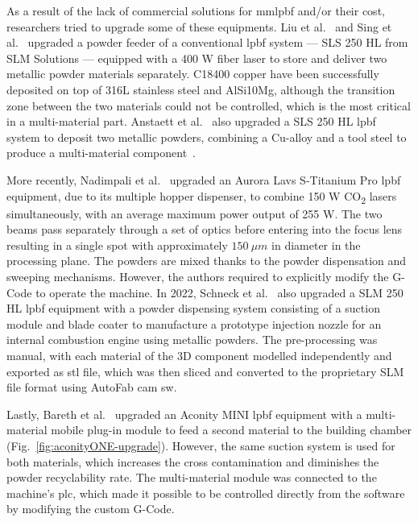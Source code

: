 As a result of the lack of commercial solutions for \gls{mmlpbf} and/or their
cost, researchers tried to upgrade some of these equipments.
Liu et al.~\cite{liu2014interfacial} and Sing et al.~\cite{sing2015interfacial} upgraded a powder
feeder of a conventional \gls{lpbf} system --- SLS 250 HL from SLM Solutions ---
equipped with a 400 W fiber laser to store and deliver two metallic powder materials separately.
C18400 copper have been successfully
deposited on top of 316L stainless steel and AlSi10Mg, although the transition zone
between the two materials could not be controlled, which is the most critical in a multi-material part.
Anstaett et al.~\cite{anstaett2017fabrication} also upgraded a SLS 250 HL
\gls{lpbf} system to deposit two metallic powders, combining a Cu-alloy and a
tool steel to produce a multi-material component~\cite{anstaett2017fabrication}.

More recently, Nadimpali et al.~\cite{nadimpali2019MMSteels} upgraded an Aurora
Lavs S-Titanium Pro \gls{lpbf} equipment, due to its multiple hopper dispenser, to combine 150 W CO\textsubscript{2}
lasers simultaneously, with an average maximum power output of 255 W. The 
two beams pass separately through a set of optics before entering
into the focus lens resulting in a single spot with approximately $150~\mu m$
in diameter in the processing plane. The powders are mixed thanks to the powder
dispensation and sweeping mechanisms. However, the authors required to
explicitly modify the G-Code to operate the machine.
In 2022, Schneck et al.~\cite{schneck2022capability} also upgraded a SLM 250 HL
\gls{lpbf} equipment with a powder dispensing system consisting of a suction
module and blade coater to manufacture a prototype injection nozzle for an
internal combustion engine using metallic powders. The pre-processing was
manual, with each material of the 3D component modelled independently and
exported as \gls{stl} file, which was then sliced and converted to the
proprietary SLM file format using AutoFab \gls{cam} \gls{sw}.

Lastly, Bareth et al.~\cite{bareth2022Implem} upgraded an Aconity MINI
\gls{lpbf} equipment with a multi-material mobile plug-in
module to feed a second material to the building chamber (Fig.~\ref{fig:aconityONE-upgrade}). However, the same
suction system is used for both materials, which increases the cross
contamination and diminishes the powder recyclability rate. The multi-material
module was connected to the machine's \gls{plc}, which made it possible
to be controlled directly from the software by modifying the custom G-Code.

